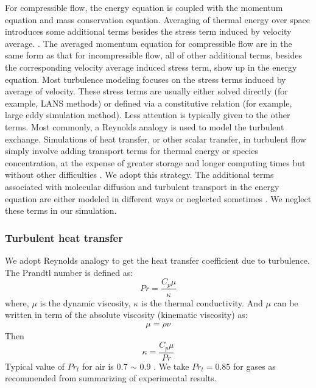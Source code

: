 \documentclass[gmd, manuscript]{copernicus}
\begin{document}
For compressible flow, the energy equation is coupled with the momentum equation and mass conservation equation. Averaging of thermal energy over space introduces some additional terms besides the stress term induced by velocity average. \citep{NASACompressibleTurbulence}. The averaged momentum equation for compressible flow are in the same form as that for incompressible flow, all of other additional terms, besides the corresponding velocity average induced stress term, show up in the energy equation. Most turbulence modeling focuses on the stress terms induced by average of velocity. These stress terms are usually either solved directly (for example, LANS methods) or defined via a constitutive relation (for example, large eddy simulation method). Less attention is typically given to the other terms. Most commonly, a Reynolds analogy is used to model the turbulent exchange. Simulations of heat transfer, or other scalar transfer, in turbulent flow simply involve adding transport terms for thermal energy or species concentration, at the expense of greater storage and longer computing times but without other difficulties \citep{cebeci2013analysis}. We adopt this strategy.
The additional terms associated with molecular diffusion and turbulent transport in the energy equation are either modeled in different ways or neglected sometimes \citep{NASACompressibleTurbulence}. We neglect these terms in our simulation.

\subsubsection{Turbulent heat transfer}
We adopt Reynolds analogy to get the heat transfer coefficient due to turbulence.
The Prandtl number is defined as:
\begin{equation}
Pr=\dfrac{C_p \mu}{\kappa}
\end{equation}
where, $\mu$ is the dynamic viscosity, $\kappa$ is the thermal conductivity. And $\mu$  can be written in term of the absolute viscosity (kinematic viscosity) as:
\begin{align}
\mu=\rho \nu
\end{align}
Then
\begin{equation}
\kappa=\dfrac{C_p \mu}{Pr}
\end{equation}
Typical value of $Pr_t$ for air is 0.7 $\sim$ 0.9 . We take $Pr_t=0.85$ for gases as recommended \citet{kays1994turbulent} from summarizing of experimental results. 
\end{document}

